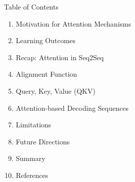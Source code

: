 \begin{frame}{Table of Contents}
  \begin{enumerate}
    \item {\color{red} Motivation for Attention Mechanisms}
    \item {\color{red} Learning Outcomes}
    \item {\color{red} Recap: Attention in Seq2Seq}
    \item {\color{red} Alignment Function}
    \item {\color{red} Query, Key, Value (QKV)}
    \item {\color{red} Attention-based Decoding Sequences}
    \item {\color{red} Limitations}
    \item {\color{red} Future Directions}
    \item {\color{red} Summary}
    \item {\color{red} References}
  \end{enumerate}
\end{frame}